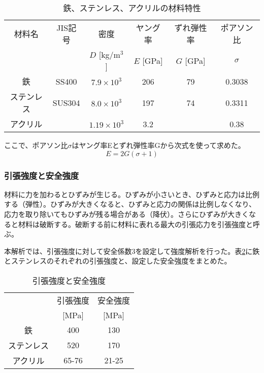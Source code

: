 \documentclass[11pt]{jreport}
\newcommand{\tabref}[1]{表\ref{#1}}
\begin{document}
\begin{table}[htbp]
\caption[鉄、ステンレス、アクリルの材料特性]{鉄、ステンレス、アクリルの材料特性}
\begin{center}
\begin{tabular}{cccccc}
\hline \hline
材料名 & JIS記号 & 密度 & ヤング率 & ずれ弾性率 & ポアソン比\\
& & $D$ [kg/m$^{3}$] & $E$ [GPa] & $G$ [GPa] & $\sigma$\\
 \hline
鉄 & SS400 & $7.9 \times 10^{3}$& 206 & 79 & 0.3038\\
ステンレス & SUS304 & $8.0 \times 10^{3}$ & 197 & 74 & 0.3311\\
アクリル & & $1.19 \times 10^{3}$ & 3.2 & & 0.38\\
\hline \hline
\end{tabular}
\end{center}
\label{MaterialProperty}
\end{table}%

ここで、ポアソン比$\sigma$はヤング率Eとずれ弾性率Gから次式を使って求めた。
\begin{equation}
E = 2G(\sigma+1)
\label{PoissonRatio}
\end{equation}

\subsubsection{引張強度と安全強度}
材料に力を加わるとひずみが生じる。ひずみが小さいとき、ひずみと応力は比例する（弾性）。ひずみが大きくなると、ひずみと応力の関係は比例しなくなり、応力を取り除いてもひずみが残る場合がある（降伏）。さらにひずみが大きくなると材料は破断する。破断する前に材料に表れる最大の引張応力を引張強度と呼ぶ。

本解析では、引張強度に対して安全係数3を設定して強度解析を行った。\tabref{SafeStress}に鉄とステンレスのそれぞれの引張強度と、設定した安全強度をまとめた。



\begin{table}[htbp]
\caption[引張強度と安全強度]{引張強度と安全強度}
\begin{center}
\begin{tabular}{ccc}
\hline \hline
& 引張強度 & 安全強度\\
& [MPa] & [MPa] \\
\hline
鉄 & 400 & 130\\
ステンレス & 520 & 170\\
アクリル & 65-76 & 21-25\\
\hline \hline
\end{tabular}
\end{center}
\label{SafeStress}
\end{table}%
\end{document}
